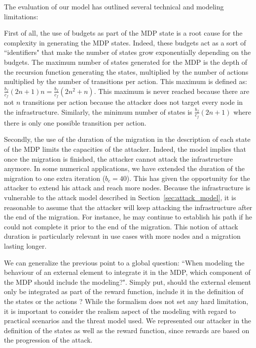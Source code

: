 \label{sec:mdp-discussion}
The evaluation of our model has outlined several technical and modeling limitations:

First of all, the use of budgets as part of the MDP state is a root cause for the complexity in generating the MDP states. Indeed, these budgets act as a sort of ``identifiers" that make the number of states grow exponentially depending on the budgets. The maximum number of states generated for the MDP is the depth of the recursion function generating the states, multiplied by the number of actions multiplied by the number of transitions per action. This maximum is defined as: $\frac{b_f}{c_f}(2n+1)n = \frac{b_f}{c_f}(2n^2+n)$. This maximum is never reached because there are not $n$ transitions per action because the attacker does not target every node in the infrastructure. Similarly, the minimum number of states is $\frac{b_f}{c_f}(2n+1)$ where there is only one possible transition per action. 

Secondly, the use of the duration of the migration in the description of each state of the MDP limits the capacities of the attacker. Indeed, the model implies that once the migration is finished, the attacker cannot attack the infrastructure anymore. 
In some numerical applications, we have extended the duration of the migration to one extra iteration ($b_c = 40$). This has given the opportunity for the attacker to extend his attack and reach more nodes.
Because the infrastructure is vulnerable to the attack model described in Section~\ref{sec:attack_model}, it is reasonable to assume that the attacker will keep attacking the infrastructure after the end of the migration. For instance, he may continue to establish his path if he could not complete it prior to the end of the migration. This notion of attack duration is particularly relevant in use cases with more nodes and a migration lasting longer.

We can generalize the previous point to a global question: ``When modeling the behaviour of an external element to integrate it in the MDP, which component of the MDP should include the modeling?". Simply put, should the external element only be integrated as part of the reward function, include it in the definition of the states or the actions ? While the formalism does not set any hard limitation, it is important to consider the realism aspect of the modeling with regard to practical scenarios and the threat model used. We represented our attacker in the definition of the states as well as the reward function, since rewards are based on the progression of the attack.



